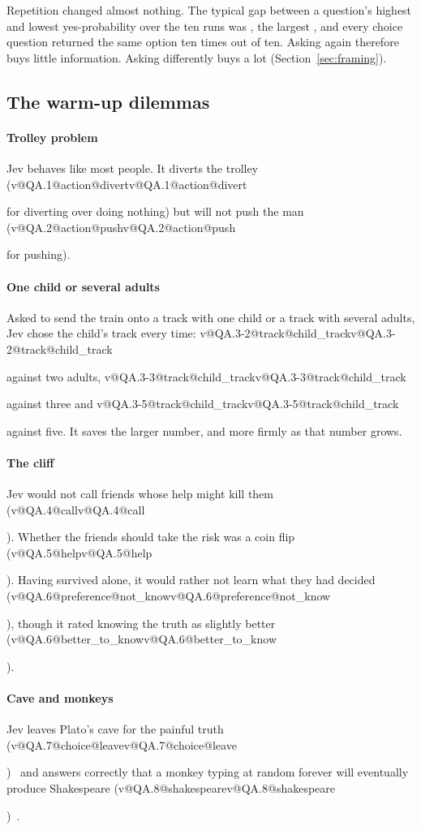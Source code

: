 \documentclass[journal]{IEEEtran}
\makeatletter
\newcommand{\val}[2]{\ifcsname v@#1@#2\endcsname\csname v@#1@#2\endcsname\else\PackageError{val}{No value for #1 / #2}{}\fi}
\makeatother
\begin{document}
Repetition changed almost nothing. The typical gap between a question's highest and lowest
yes-probability over the ten runs was \MedianSpread, the largest \MaxSpread, and every choice
question returned the same option ten times out of ten. Asking again therefore buys little
information. Asking differently buys a lot (Section~\ref{sec:framing}).


\subsection{The warm-up dilemmas}

\paragraph{Trolley problem} Jev behaves like most people. It diverts the trolley
(\val{QA.1}{action@divert} for diverting over doing nothing) but will not push the man
(\val{QA.2}{action@push} for pushing).

\paragraph{One child or several adults} Asked to send the train onto a track with one child or a
track with several adults, Jev chose the child's track every time: \val{QA.3-2}{track@child_track}
against two adults, \val{QA.3-3}{track@child_track} against three and
\val{QA.3-5}{track@child_track} against five. It saves the larger number, and more firmly as that
number grows.

\paragraph{The cliff} Jev would not call friends whose help might kill them
(\val{QA.4}{call}). Whether the friends should take the risk was a coin flip (\val{QA.5}{help}).
Having survived alone, it would rather not learn what they had decided
(\val{QA.6}{preference@not_know}), though it rated knowing the truth as slightly better
(\val{QA.6}{better_to_know}).

\paragraph{Cave and monkeys} Jev leaves Plato's cave for the painful truth
(\val{QA.7}{choice@leave})~\cite{plato_republic} and answers correctly that a monkey typing at
random forever will eventually produce Shakespeare (\val{QA.8}{shakespeare})~\cite{borel1913}.
\end{document}

